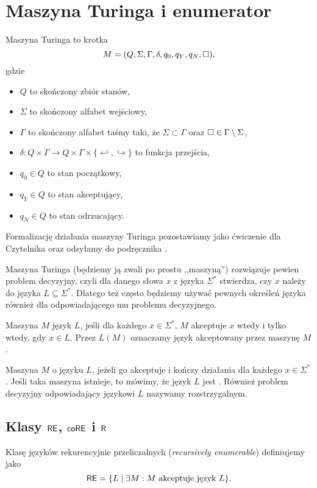 \section{Maszyna Turinga i enumerator}

\begin{definition}
    Maszyna Turinga to krotka
    \[ M = (Q, \Sigma, \Gamma, \delta, q_0, q_Y, q_N, \square),\]
    gdzie
    \begin{itemize}[noitemsep]
        \item $Q$ to skończony zbiór stanów,
        \item $\Sigma$ to skończony alfabet wejściowy,
        \item $\Gamma$ to skończony alfabet taśmy taki, że $\Sigma \subset \Gamma$ oraz $\square \in \Gamma \setminus \Sigma$,
        \item $\delta : Q \times \Gamma \to Q \times \Gamma \times \{\hookleftarrow , \hookrightarrow\}$ to funkcja przejścia,
        \item $q_0 \in Q$ to stan początkowy,
        \item $q_Y \in Q$ to stan akceptujący,
        \item $q_N \in Q$ to stan odrzucający.
    \end{itemize}
    Formalizację działania maszyny Turinga pozostawiamy jako ćwiczenie dla Czytelnika oraz odsyłamy do podręcznika \cite{Sipser}.
\end{definition}

Maszyna Turinga (będziemy ją zwali po prostu ,,maszyną'') rozwiązuje pewien problem decyzyjny, czyli dla danego słowa $x$ z języka $\Sigma^*$ stwierdza, czy $x$ należy do języka $L \subseteq \Sigma^*$. Dlatego też często będziemy używać pewnych określeń języka również dla odpowiadającego mu problemu decyzyjnego.

Maszyna $M$  język $L$, jeśli dla każdego $x \in \Sigma^*$, $M$ akceptuje $x$ wtedy i tylko wtedy, gdy $x \in L$. Przez $L(M)$ oznaczamy język akceptowany przez maszynę $M$.

Maszyna $M$  o języku $L$, jeżeli go akceptuje i kończy działania dla każdego $x \in \Sigma^*$. Jeśli taka maszyna istnieje, to mówimy, że język $L$ jest . Również problem decyzyjny odpowiadający językowi $L$ nazywamy rozstrzygalnym.

\subsection{Klasy $\textsf{RE}$, $\textsf{coRE}$ i $\textsf{R}$}
\begin{definition}
    Klasę języków rekurencyjnie przeliczalnych (\textit{recursively enumerable}) definiujemy jako
    \[ \textsf{RE} = \{L \mid \exists M : M \text{ akceptuje język } L \}. \]
\end{definition}

